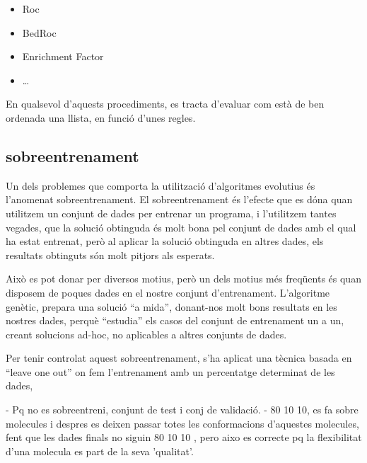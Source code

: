 \documentclass[titlepage,a4paper,12pt]{book}
\begin{document}

\begin{itemize}
	\item Roc
	\item BedRoc
	\item Enrichment Factor
	\item \dots
\end{itemize}


En qualsevol d'aquests procediments, es tracta d'evaluar com està de ben ordenada una llista, en
funció d'unes regles.



\subsection{sobreentrenament} %
\label{sub:sobreentrenament}

Un dels problemes que comporta la utilització d'algoritmes evolutius és
l'anomenat sobreentrenament.  El sobreentrenament és l'efecte que es dóna quan
utilitzem un conjunt de dades per entrenar un programa, i l'utilitzem tantes
vegades, que la solució obtinguda és molt bona pel conjunt de dades amb el qual
ha estat entrenat, però al aplicar la solució obtinguda en altres dades, els
resultats obtinguts són molt pitjors als esperats.

Això es pot donar per diversos motius, però un dels motius més freqüents és quan
disposem de poques dades en el nostre conjunt d'entrenament.  L'algoritme
genètic, prepara una solució ``a mida'', donant-nos molt bons resultats en les
nostres dades, perquè ``estudia'' els casos del conjunt de entrenament un a un,
creant solucions ad-hoc, no aplicables a altres conjunts de dades.

Per tenir controlat aquest sobreentrenament, s'ha aplicat una tècnica basada en
``leave one out'' on fem l'entrenament amb un percentatge determinat de les
dades, 

- Pq no es sobreentreni, conjunt de test i conj de validació.
- 80 10 10, es fa sobre molecules i despres es deixen passar totes les
conformacions d'aquestes molecules, fent que les dades finals no siguin 80 10 10
, pero aixo es correcte pq la flexibilitat d'una molecula es part de la seva
'qualitat'.


\end{document}
